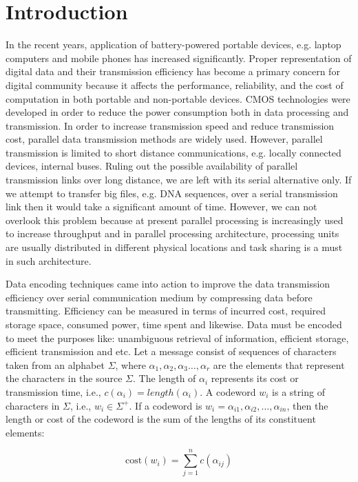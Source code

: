 \documentclass[preprint,12pt]{elsarticle}
\begin{document}
\section{Introduction}
In the recent years, application of battery-powered portable devices, e.g. laptop computers and mobile phones has increased significantly. Proper representation of digital data and their transmission efficiency has become a primary concern for digital community because it affects the performance, reliability, and the cost of computation in both portable and non-portable devices. CMOS technologies were developed in order to reduce the power consumption both in data processing and transmission. In order to increase transmission speed and reduce transmission cost, parallel data transmission methods are widely used. However, parallel transmission is limited to short distance communications, e.g. locally connected devices, internal buses. Ruling out the possible availability of parallel transmission
links over long distance, we are left with its serial alternative only. If we attempt to transfer big files, e.g. DNA sequences, over a serial transmission link then it would take a significant amount of time. However, we can not overlook this problem because at present parallel processing is increasingly used to increase throughput and in parallel processing architecture, processing units are usually distributed in different physical locations and task sharing is a must in such architecture.    

Data encoding techniques came into action to improve the data transmission efficiency over serial communication medium by compressing data before transmitting. Efficiency can be measured in terms of incurred cost, required storage space, consumed power, time spent and likewise. Data must be
encoded to meet the purposes like: unambiguous retrieval of information, efficient storage, efficient transmission and etc. Let a message consist of sequences of characters taken from an alphabet $\Sigma$, where  $\alpha_1,\alpha_2,\alpha_3\ldots,\alpha_r$ are the elements that represent the characters in the source $\Sigma$. The length of $\alpha_i$ represents its cost or transmission time, i.e., $c\left(\alpha_i\right)= length(\alpha_i)$. A codeword $w_i$ is a string of characters in $\Sigma$, i.e., $w_i\in\Sigma^{+}$. If a codeword is $w_i=\alpha_{i1},\alpha_{i2},\ldots,\alpha_{in}$, then the length or cost of the codeword is the sum of the lengths of its constituent elements:

\begin{equation}
\label{eqn1}
  \text{cost}\left(w_i\right)=\sum_{j=1}^{n}c\left(\alpha_{ij}\right)
\end{equation} 
  
\end{document}
